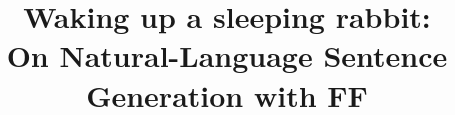 \documentclass[letterpaper]{article}
\begin{document}
\title{Waking up a sleeping rabbit:\\ On Natural-Language Sentence Generation with FF}


\author{
}

\nocopyright

\maketitle












\end{document}
